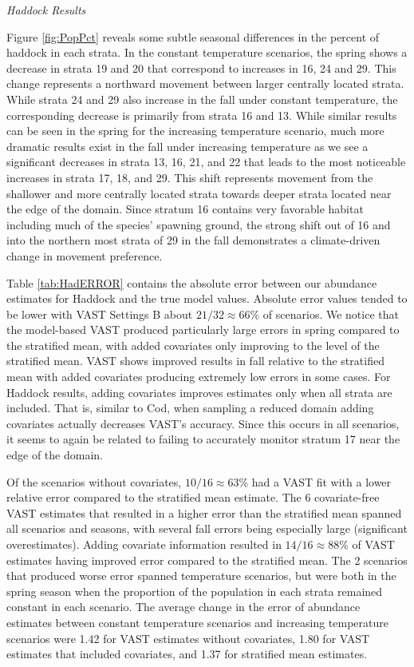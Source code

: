 \documentclass[
  12pt,
]{article}
\begin{document}
\emph{Haddock Results}

Figure \ref{fig:PopPct} reveals some subtle seasonal differences in the percent of haddock in each strata. In the constant temperature scenarios, the spring shows a decrease in strata 19 and 20 that correspond to increases in 16, 24 and 29. This change represents a northward movement between larger centrally located strata. While strata 24 and 29 also increase in the fall under constant temperature, the corresponding decrease is primarily from strata 16 and 13. While similar results can be seen in the spring for the increasing temperature scenario, much more dramatic results exist in the fall under increasing temperature as we see a significant decreases in strata 13, 16, 21, and 22 that leads to the most noticeable increases in strata 17, 18, and 29. This shift represents movement from the shallower and more centrally located strata towards deeper strata located near the edge of the domain. Since stratum 16 contains very favorable habitat including much of the species' spawning ground, the strong shift out of 16 and into the northern most strata of 29 in the fall demonstrates a climate-driven change in movement preference.

Table \ref{tab:HadERROR} contains the absolute error between our abundance estimates for Haddock and the true model values. Absolute error values tended to be lower with VAST Settings B about \(21/32\approx 66\%\) of scenarios. We notice that the model-based VAST produced particularly large errors in spring compared to the stratified mean, with added covariates only improving to the level of the stratified mean. VAST shows improved results in fall relative to the stratified mean with added covariates producing extremely low errors in some cases. For Haddock results, adding covariates improves estimates only when all strata are included. That is, similar to Cod, when sampling a reduced domain adding covariates actually decreases VAST's accuracy. Since this occurs in all scenarios, it seems to again be related to failing to accurately monitor stratum 17 near the edge of the domain.

Of the scenarios without covariates, \(10/16\approx63\)\% had a VAST fit with a lower relative error compared to the stratified mean estimate. The 6 covariate-free VAST estimates that resulted in a higher error than the stratified mean spanned all scenarios and seasons, with several fall errors being especially large (significant overestimates). Adding covariate information resulted in \(14/16\approx88\)\% of VAST estimates having improved error compared to the stratified mean. The 2 scenarios that produced worse error spanned temperature scenarios, but were both in the spring season when the proportion of the population in each strata remained constant in each scenario. The average change in the error of abundance estimates between constant temperature scenarios and increasing temperature scenarios were 1.42 for VAST estimates without covariates, 1.80 for VAST estimates that included covariates, and 1.37 for stratified mean estimates.
\end{document}
